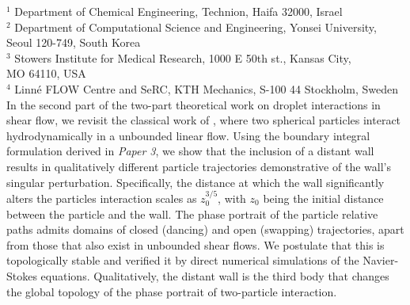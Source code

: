%
%
%
%
%
%
%
\paperaffiliation
{%
  $^1$ Department of Chemical Engineering, Technion, Haifa 32000, Israel\\%
  $^2$ Department of Computational Science and Engineering, Yonsei University, \\Seoul 120-749, South Korea\\%
  $^3$ Stowers Institute for Medical Research, 1000 E 50th st., Kansas City, \\MO 64110, USA\\%
  $^4$ Linn\'e FLOW Centre and SeRC, KTH Mechanics, S-100 44 Stockholm, Sweden%
}%
%
%
%
\papervolume{}%
%
\papernumber{}
%
\paperpages{}%
%
\paperyear{}%
%
\papersummary%
{%
   In the second part of the two-part theoretical work on droplet interactions in shear flow,
   we revisit the classical work of \cite{batchelor_green_1972}, where two spherical particles interact hydrodynamically in a unbounded linear flow.
   Using the boundary integral formulation derived in \emph{Paper 3},
   we show that the inclusion of a distant wall results in qualitatively different particle trajectories demonstrative of the wall's singular perturbation.
   Specifically, the distance at which the wall significantly alters the particles interaction scales as $z_0^{3/5}$,
   with $z_0$ being the initial distance between the particle and the wall.
   The phase portrait of the particle relative paths admits domains of closed (dancing) and open (swapping) trajectories,
   apart from those that also exist in unbounded shear flows.
   We postulate that this is topologically stable and verified it by direct numerical simulations of the Navier-Stokes equations.
   Qualitatively, the distant wall is the third body that changes the global topology of the phase portrait of two-particle interaction.
}%
